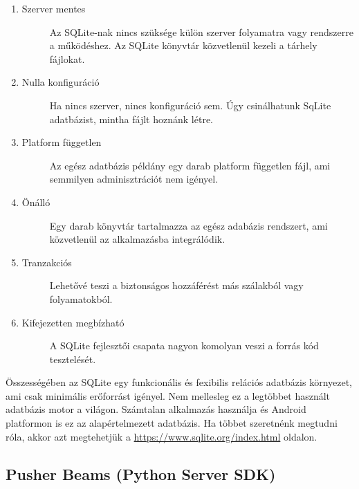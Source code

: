 \documentclass{thesis-ekf}
\theoremstyle{definition}
\theoremstyle{remark}
\begin{document}
\begin{enumerate}
	\item
	\begin{description}
		\item[Szerver mentes] Az SQLite-nak nincs szüksége külön szerver folyamatra vagy rendszerre a működéshez. Az SQLite könyvtár közvetlenül kezeli a tárhely fájlokat.
	\end{description}
	\item
	\begin{description}
		\item[Nulla konfiguráció] Ha nincs szerver, nincs konfiguráció sem. Úgy csinálhatunk SqLite adatbázist, mintha fájlt hoznánk létre.
	\end{description}
	\item
	\begin{description}
		\item[Platform független] Az egész adatbázis példány egy darab platform független fájl, ami semmilyen adminisztrációt nem igényel.
	\end{description}
	\item
	\begin{description}
		\item[Önálló] Egy darab könyvtár tartalmazza az egész adabázis rendszert, ami közvetlenül az alkalmazásba integrálódik.
	\end{description}
	\item
	\begin{description}
		\item[Tranzakciós] Lehetővé teszi a biztonságos hozzáférést más szálakból vagy folyamatokból.
	\end{description}
	\item
	\begin{description}
		\item[Kifejezetten megbízható] A SQLite fejlesztői csapata nagyon komolyan veszi a forrás kód tesztelését.
	\end{description}
\end{enumerate}

Összességében az SQLite egy funkcionális és fexibilis relációs adatbázis környezet, ami csak minimális erőforrást igényel.
\cite{sqlite}
Nem mellesleg ez a legtöbbet használt adatbázis motor a világon. 
Számtalan alkalmazás használja és Android platformon is ez az alapértelmezett adatbázis.
Ha többet szeretnénk megtudni róla, akkor azt megtehetjük a \url{https://www.sqlite.org/index.html} oldalon.

\subsection{Pusher Beams (Python Server SDK)}\label{pusher_server}
\end{document}
